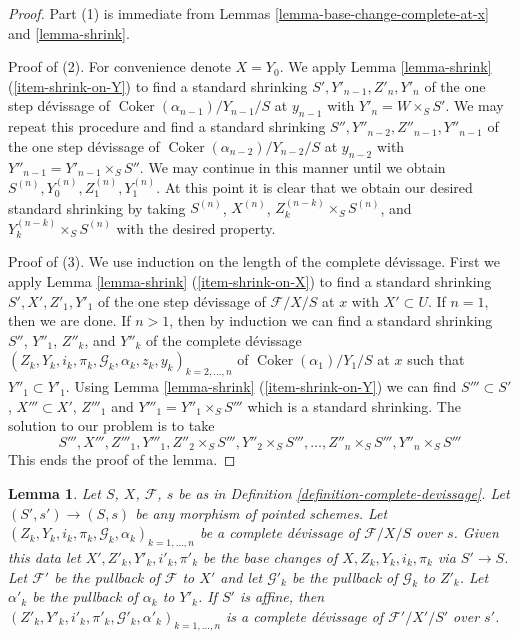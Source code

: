 \documentclass{amsart}
\theoremstyle{plain}
\newtheorem{lemma}[subsection]{Lemma}
\theoremstyle{definition}
\theoremstyle{remark}
\numberwithin{equation}{subsection}
\def\Coker{\mathop{\mathrm{Coker}}}
\begin{document}
\begin{proof}
Part (1) is immediate from
Lemmas \ref{lemma-base-change-complete-at-x} and
\ref{lemma-shrink}.

\medskip\noindent
Proof of (2). For convenience denote $X = Y_0$. We apply
Lemma \ref{lemma-shrink} (\ref{item-shrink-on-Y})
to find a standard shrinking
$S', Y'_{n - 1}, Z'_n, Y'_n$
of the one step d\'evissage of $\Coker(\alpha_{n - 1})/Y_{n - 1}/S$
at $y_{n - 1}$ with $Y'_n = W \times_S S'$. We may repeat this procedure
and find a standard shrinking
$S'', Y''_{n - 2}, Z''_{n - 1}, Y''_{n - 1}$
of the one step d\'evissage of $\Coker(\alpha_{n - 2})/Y_{n - 2}/S$
at $y_{n - 2}$ with $Y''_{n - 1} = Y'_{n - 1} \times_S S''$.
We may continue in this manner until we obtain
$S^{(n)}, Y^{(n)}_0, Z^{(n)}_1, Y^{(n)}_1$.
At this point it is clear that we obtain our desired standard shrinking
by taking $S^{(n)}$, $X^{(n)}$, $Z_k^{(n - k)} \times_S S^{(n)}$, and
$Y_k^{(n - k)} \times_S S^{(n)}$ with the desired property.

\medskip\noindent
Proof of (3). We use induction on the length of the complete
d\'evissage. First we apply
Lemma \ref{lemma-shrink} (\ref{item-shrink-on-X})
to find a standard shrinking
$S', X', Z'_1, Y'_1$
of the one step d\'evissage of $\mathcal{F}/X/S$ at $x$
with $X' \subset U$. If $n = 1$, then we are done.
If $n > 1$, then by induction we can find a standard shrinking
$S''$, $Y''_1$, $Z''_k$, and $Y''_k$ of the complete d\'evissage
$(Z_k, Y_k, i_k, \pi_k, \mathcal{G}_k, \alpha_k, z_k, y_k)_{k = 2, \ldots, n}$
of $\Coker(\alpha_1)/Y_1/S$ at $x$ such that
$Y''_1 \subset Y'_1$. Using
Lemma \ref{lemma-shrink} (\ref{item-shrink-on-Y})
we can find $S''' \subset S'$, $X''' \subset X'$, $Z'''_1$ and
$Y'''_1 = Y''_1 \times_S S'''$ which is a standard shrinking.
The solution to our problem is to take
$$
S''', X''', Z'''_1, Y'''_1, Z''_2 \times_S S''',
Y''_2 \times_S S''', \ldots, Z''_n \times_S S''', Y''_n \times_S S'''
$$
This ends the proof of the lemma.
\end{proof}


\begin{lemma}
\label{lemma-base-change-complete}
Let $S$, $X$, $\mathcal{F}$, $s$ be as in
Definition \ref{definition-complete-devissage}.
Let $(S', s') \to (S, s)$ be any morphism of pointed schemes.
Let $(Z_k, Y_k, i_k, \pi_k, \mathcal{G}_k, \alpha_k)_{k = 1, \ldots, n}$
be a complete d\'evissage of $\mathcal{F}/X/S$ over $s$.
Given this data let $X', Z'_k, Y'_k, i'_k, \pi'_k$ be the base
changes of $X, Z_k, Y_k, i_k, \pi_k$ via $S' \to S$.
Let $\mathcal{F}'$ be the pullback of $\mathcal{F}$ to $X'$
and let $\mathcal{G}'_k$ be the pullback of $\mathcal{G}_k$ to $Z'_k$.
Let $\alpha'_k$ be the pullback of $\alpha_k$ to $Y'_k$.
If $S'$ is affine, then
$(Z'_k, Y'_k, i'_k, \pi'_k, \mathcal{G}'_k, \alpha'_k)_{k = 1, \ldots, n}$
is a complete d\'evissage of $\mathcal{F}'/X'/S'$ over $s'$.
\end{lemma}
\end{document}
